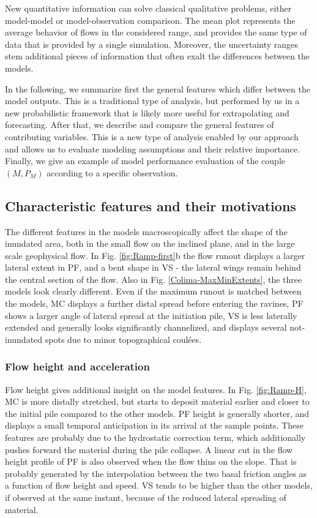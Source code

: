 \documentclass{article}
\begin{document}
New quantitative information can solve classical qualitative problems, either model-model or model-observation comparison. The mean plot represents the average behavior of flows in the considered range, and provides the same type of data that is provided by a single simulation. Moreover, the uncertainty ranges stem additional pieces of information that often exalt the differences between the models.

In the following, we summarize first the general features which differ between the model outputs. This is a traditional type of analysis, but performed by us in a new probabilistic framework that is likely more useful for extrapolating and forecasting. After that, we describe and compare the general features of contributing variables. This is a new type of analysis enabled by our approach and allows us to evaluate modeling assumptions and their relative importance. Finally, we give an example of model performance evaluation of the couple $\left(M, P_M\right)$ according to a specific observation.


\subsection{Characteristic features and their motivations}
The different features in the models macroscopically affect the shape of the inundated area, both in the small flow on the inclined plane, and in the large scale geophysical flow. In Fig. \ref{fig:Ramp-first}b the flow runout displays a larger lateral extent in PF, and a bent shape in VS - the lateral wings remain behind the central section of the flow. Also in Fig. \ref{Colima-MaxMinExtents}, the three models look clearly different. Even if the maximum runout is matched between the models, MC displays a further distal spread before entering the ravines, PF shows a larger angle of lateral spread at the initiation pile, VS is less laterally extended and generally looks significantly channelized, and displays several not-inundated spots due to minor topographical coul\'{e}es.

\subsubsection{Flow height and acceleration}
Flow height gives additional insight on the model features. In Fig. \ref{fig:Ramp-H}, MC is more distally stretched, but starts to deposit material earlier and closer to the initial pile compared to the other models. PF height is generally shorter, and displays a small temporal anticipation in its arrival at the sample points. These features are probably due to the hydrostatic correction term, which additionally pushes forward the material during the pile collapse. A linear cut in the flow height profile of PF is also observed when the flow thins on the slope. That is probably generated by the interpolation between the two basal friction angles as a function of flow height and speed. VS tends to be higher than the other models, if observed at the same instant, because of the reduced lateral spreading of material.
\end{document}
